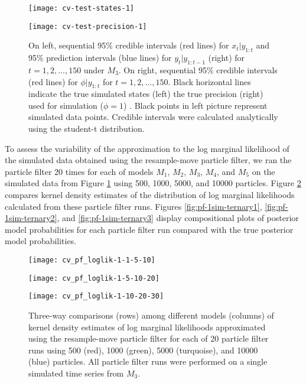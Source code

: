 \documentclass{article}
\begin{document}
\begin{figure}
\begin{minipage}{0.5\textwidth}
\texttt{[image: cv-test-states-1]}
\end{minipage}
\begin{minipage}{0.5\textwidth}
\texttt{[image: cv-test-precision-1]}
\end{minipage}
\caption{On left, sequential 95\% credible intervals (red lines) for $x_t|y_{1:t}$ and 95\% prediction intervals (blue lines) for $y_t|y_{1:t-1}$ (right) for $t = 1, 2, \ldots, 150$ under $M_3$. On right, sequential 95\% credible intervals (red lines) for $\phi|y_{1:t}$ for $t = 1, 2, \ldots, 150$. Black horizontal lines indicate the true simulated states (left) the true precision (right) used for simulation ($\phi = 1$) . Black points in left picture represent simulated data points. Credible intervals were calculated analytically using the student-t distribution.} \label{fig:sim}
\end{figure}

To assess the variability of the approximation to the log marginal likelihood of the simulated data obtained using the resample-move particle filter, we ran the particle filter 20 times for each of models $M_1$, $M_2$, $M_3$, $M_4$, and $M_5$ on the simulated data from Figure \ref{fig:sim} using 500, 1000, 5000, and 10000 particles. Figure \ref{fig:pf-hist} compares kernel density estimates of the distribution of log marginal likelihoods calculated from these particle filter runs. Figures \ref{fig:pf-1sim-ternary1}, \ref{fig:pf-1sim-ternary2}, and \ref{fig:pf-1sim-ternary3} display compositional plots of posterior model probabilities for each particle filter run compared with the true posterior model probabilities.

\begin{figure}
\begin{minipage}{1.0\linewidth}
\texttt{[image: cv\_pf\_loglik-1-1-5-10]}
\end{minipage}
\begin{minipage}{1.0\linewidth}
\texttt{[image: cv\_pf\_loglik-1-5-10-20]}
\end{minipage}
\begin{minipage}{1.0\linewidth}
\texttt{[image: cv\_pf\_loglik-1-10-20-30]}
\end{minipage}
\caption{Three-way comparisons (rows) among different models (columns) of kernel density estimates of log marginal likelihoods approximated using the resample-move particle filter for each of 20 particle filter runs using 500 (red), 1000 (green), 5000 (turquoise), and 10000 (blue) particles. All particle filter runs were performed on a single simulated time series from $M_3$.} \label{fig:pf-hist}
\end{figure}
\end{document}
